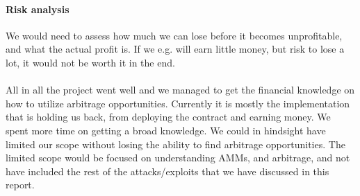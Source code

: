 \paragraph{Risk analysis} We would need to assess how much we can lose before it
becomes unprofitable, and what the actual profit is. If we e.g. will earn little
money, but risk to lose a lot, it would not be worth it in the end.\\\\
All in all the project went well and we managed to get the financial knowledge
on how to utilize arbitrage opportunities. Currently it is mostly the
implementation that is holding us back, from deploying the contract and earning
money. We spent more time on getting a broad knowledge. We could in hindsight
have limited our scope without losing the ability to find arbitrage
opportunities. The limited scope would be focused on understanding AMMs, and
arbitrage, and not have included the rest of the attacks/exploits that we have
discussed in this report.
